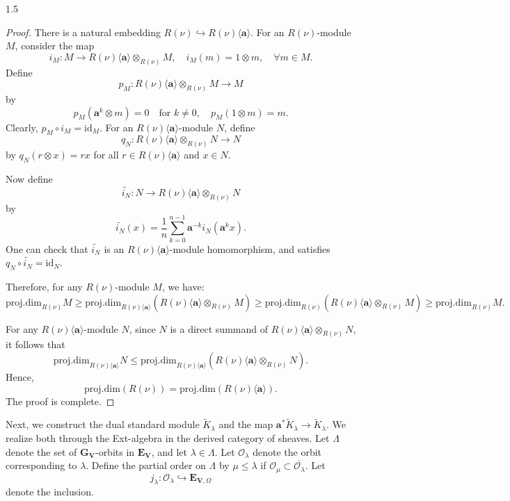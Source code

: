 \documentclass[10pt]{amsart}
\begin{document}
\begin{spacing}{1.5}
\begin{proof}
There is a natural embedding $R(\nu) \hookrightarrow R(\nu)\langle\mathbf{a}\rangle$. For an $R(\nu)$-module $M$, consider the map
\[
i_M : M \to R(\nu)\langle\mathbf{a}\rangle \otimes_{R(\nu)} M, \quad i_M(m) = 1 \otimes m, \quad \forall m \in M.
\]
Define
\[
p_M : R(\nu)\langle\mathbf{a}\rangle \otimes_{R(\nu)} M \to M
\]
by
\[
p_M(\mathbf{a}^k \otimes m) = 0 \quad \text{for } k \ne 0, \quad p_M(1 \otimes m) = m.
\]
Clearly, $p_M \circ i_M = \mathrm{id}_M$. For an $R(\nu)\langle\mathbf{a}\rangle$-module $N$, define
\[
q_N : R(\nu)\langle\mathbf{a}\rangle \otimes_{R(\nu)} N \to N
\]
by $q_N(r \otimes x) = r x$ for all $r \in R(\nu)\langle\mathbf{a}\rangle$ and $x \in N$.

Now define
\[
\tilde{i_N} : N \to R(\nu)\langle\mathbf{a}\rangle \otimes_{R(\nu)} N
\]
by
\[
\tilde{i_N}(x) = \frac{1}{n} \sum_{k=0}^{n-1} \mathbf{a}^{-k} i_N(\mathbf{a}^k x).
\]
One can check that $\tilde{i_N}$ is an $R(\nu)\langle\mathbf{a}\rangle$-module homomorphism, and satisfies $q_N \circ \tilde{i_N} = \mathrm{id}_N$.

Therefore, for any $R(\nu)$-module $M$, we have:
\[
\mathrm{proj.dim}_{R(\nu)} M \geq \mathrm{proj.dim}_{R(\nu)\langle\mathbf{a}\rangle}(R(\nu)\langle\mathbf{a}\rangle \otimes_{R(\nu)} M)
\geq \mathrm{proj.dim}_{R(\nu)}(R(\nu)\langle\mathbf{a}\rangle \otimes_{R(\nu)} M) \geq \mathrm{proj.dim}_{R(\nu)} M.
\]

For any $R(\nu)\langle\mathbf{a}\rangle$-module $N$, since $N$ is a direct summand of $R(\nu)\langle\mathbf{a}\rangle \otimes_{R(\nu)} N$, it follows that
\[
\mathrm{proj.dim}_{R(\nu)\langle\mathbf{a}\rangle} N \leq \mathrm{proj.dim}_{R(\nu)\langle\mathbf{a}\rangle}(R(\nu)\langle\mathbf{a}\rangle \otimes_{R(\nu)} N).
\]
Hence,
\[
\mathrm{proj.dim}(R(\nu)) = \mathrm{proj.dim}(R(\nu)\langle\mathbf{a}\rangle).
\]
The proof is complete.
\end{proof}

Next, we construct the dual standard module $\tilde{K}_{\lambda}$ and the map $\mathbf{a}^* \tilde{K}_{\lambda} \to \tilde{K}_{\lambda}$. We realize both through the Ext-algebra in the derived category of sheaves. Let $\Lambda$ denote the set of $\mathbf{G}_{\mathbf{V}}$-orbits in $\mathbf{E}_{\mathbf{V}}$, and let $\lambda \in \Lambda$. Let $\mathcal{O}_{\lambda}$ denote the orbit corresponding to $\lambda$. Define the partial order on $\Lambda$ by $\mu \leq \lambda$ if $\mathcal{O}_{\mu} \subset \overline{\mathcal{O}_{\lambda}}$. Let
\[
j_{\lambda} : \mathcal{O}_{\lambda} \hookrightarrow \mathbf{E}_{\mathbf{V},\Omega}
\]
denote the inclusion.


\end{spacing}
\end{document}
